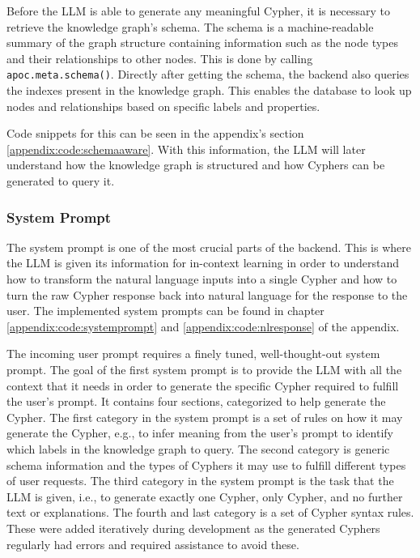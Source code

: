 Before the LLM is able to generate any meaningful Cypher, it is necessary to retrieve the knowledge graph's schema. The schema is a machine-readable summary of the graph structure containing information such as the node types and their relationships to other nodes. This is done by calling \texttt{apoc.meta.schema()}. \cite{neo4j_apoc_meta_schema} Directly after getting the schema, the backend also queries the indexes present in the knowledge graph. This enables the database to look up nodes and relationships based on specific labels and properties. \cite{neo4j_cypher_indexes}

Code snippets for this can be seen in the appendix's section \ref{appendix:code:schemaaware}. With this information, the LLM will later understand how the knowledge graph is structured and how Cyphers can be generated to query it.

\subsubsection{System Prompt}
\label{sub:prompt}
The system prompt is one of the most crucial parts of the backend. This is where the LLM is given its information for in-context learning in order to understand how to transform the natural language inputs into a single Cypher and how to turn the raw Cypher response back into natural language for the response to the user. The implemented system prompts can be found in chapter \ref{appendix:code:systemprompt} and \ref{appendix:code:nlresponse} of the appendix.

The incoming user prompt requires a finely tuned, well-thought-out system prompt. The goal of the first system prompt is to provide the LLM with all the context that it needs in order to generate the specific Cypher required to fulfill the user's prompt. It contains four sections, categorized to help generate the Cypher. The first category in the system prompt is a set of rules on how it may generate the Cypher, e.g., to infer meaning from the user's prompt to identify which labels in the knowledge graph to query. The second category is generic schema information and the types of Cyphers it may use to fulfill different types of user requests. The third category in the system prompt is the task that the LLM is given, i.e., to generate exactly one Cypher, only Cypher, and no further text or explanations. The fourth and last category is a set of Cypher syntax rules. These were added iteratively during development as the generated Cyphers regularly had errors and required assistance to avoid these.

